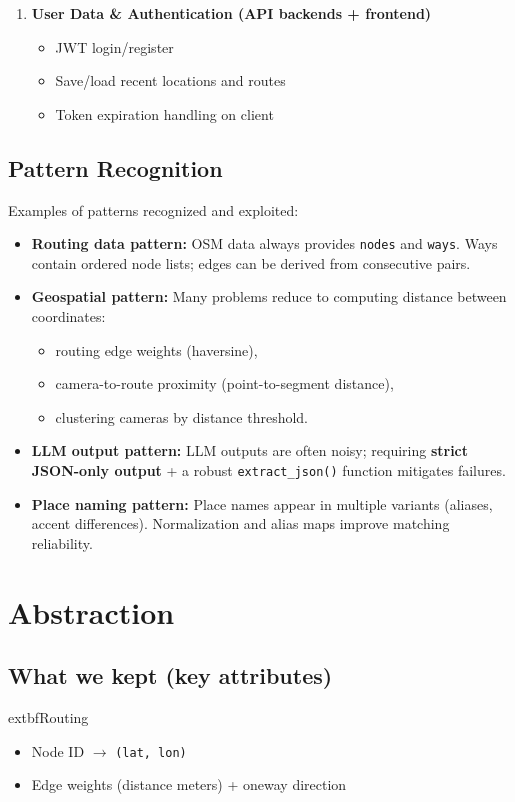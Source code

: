 \begin{enumerate}
  \item \textbf{User Data \& Authentication (API backends + frontend)}
  \begin{itemize}
    \item JWT login/register
    \item Save/load recent locations and routes
    \item Token expiration handling on client
  \end{itemize}
\end{enumerate}

\subsection{Pattern Recognition}
Examples of patterns recognized and exploited:
\begin{itemize}
  \item \textbf{Routing data pattern:} OSM data always provides \texttt{nodes} and \texttt{ways}. Ways contain ordered node lists; edges can be derived from consecutive pairs.
  \item \textbf{Geospatial pattern:} Many problems reduce to computing distance between coordinates:
  \begin{itemize}
    \item routing edge weights (haversine),
    \item camera-to-route proximity (point-to-segment distance),
    \item clustering cameras by distance threshold.
  \end{itemize}
  \item \textbf{LLM output pattern:} LLM outputs are often noisy; requiring \textbf{strict JSON-only output} + a robust \texttt{extract\_json()} function mitigates failures.
  \item \textbf{Place naming pattern:} Place names appear in multiple variants (aliases, accent differences). Normalization and alias maps improve matching reliability.
\end{itemize}

\section{Abstraction}

\subsection{What we kept (key attributes)}
	extbf{Routing}
\begin{itemize}
  \item Node ID $\rightarrow$ \texttt{(lat, lon)}
  \item Edge weights (distance meters) + oneway direction
\end{itemize}


